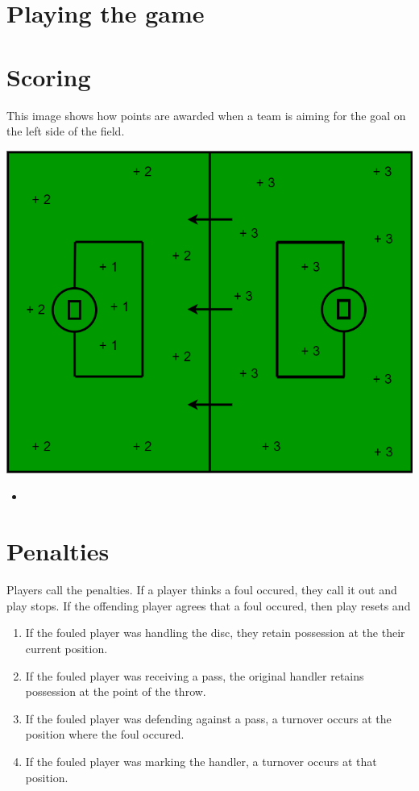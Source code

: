 \documentclass[10pt]{article}
\begin{document}
    \section{Playing the game}
    \section{Scoring}

    This image shows how points are awarded when a team is aiming for the goal on the left side of the field.

    \vspace{5pt}

    \includegraphics[width=.7\textwidth]{field/field_points}

    \begin{itemize}
        \item 
    \end{itemize}

    \section{Penalties}

    Players call the penalties. If a player thinks a foul occured, they call it out and play stops. If the offending player agrees that a foul occured, then play resets and 
    \begin{enumerate}
        \item If the fouled player was handling the disc, they retain possession at the their current position.
        \item If the fouled player was receiving a pass, the original handler retains possession at the point of the throw.
        \item If the fouled player was defending against a pass, a turnover occurs at the position where the foul occured.
        \item If the fouled player was marking the handler, a turnover occurs at that position.
    \end{enumerate}
\end{document}
